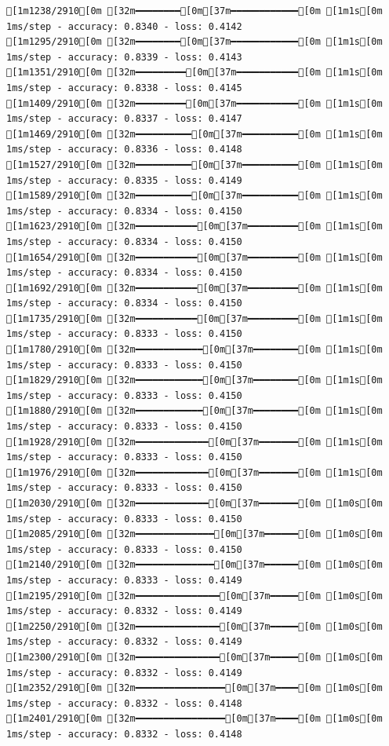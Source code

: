 \documentclass[
  letterpaper,
  DIV=11,
  numbers=noendperiod]{scrartcl}
\begin{document}
\begin{verbatim}
[1m1238/2910[0m [32m━━━━━━━━[0m[37m━━━━━━━━━━━━[0m [1m1s[0m 1ms/step - accuracy: 0.8340 - loss: 0.4142
[1m1295/2910[0m [32m━━━━━━━━[0m[37m━━━━━━━━━━━━[0m [1m1s[0m 1ms/step - accuracy: 0.8339 - loss: 0.4143
[1m1351/2910[0m [32m━━━━━━━━━[0m[37m━━━━━━━━━━━[0m [1m1s[0m 1ms/step - accuracy: 0.8338 - loss: 0.4145
[1m1409/2910[0m [32m━━━━━━━━━[0m[37m━━━━━━━━━━━[0m [1m1s[0m 1ms/step - accuracy: 0.8337 - loss: 0.4147
[1m1469/2910[0m [32m━━━━━━━━━━[0m[37m━━━━━━━━━━[0m [1m1s[0m 1ms/step - accuracy: 0.8336 - loss: 0.4148
[1m1527/2910[0m [32m━━━━━━━━━━[0m[37m━━━━━━━━━━[0m [1m1s[0m 1ms/step - accuracy: 0.8335 - loss: 0.4149
[1m1589/2910[0m [32m━━━━━━━━━━[0m[37m━━━━━━━━━━[0m [1m1s[0m 1ms/step - accuracy: 0.8334 - loss: 0.4150
[1m1623/2910[0m [32m━━━━━━━━━━━[0m[37m━━━━━━━━━[0m [1m1s[0m 1ms/step - accuracy: 0.8334 - loss: 0.4150
[1m1654/2910[0m [32m━━━━━━━━━━━[0m[37m━━━━━━━━━[0m [1m1s[0m 1ms/step - accuracy: 0.8334 - loss: 0.4150
[1m1692/2910[0m [32m━━━━━━━━━━━[0m[37m━━━━━━━━━[0m [1m1s[0m 1ms/step - accuracy: 0.8334 - loss: 0.4150
[1m1735/2910[0m [32m━━━━━━━━━━━[0m[37m━━━━━━━━━[0m [1m1s[0m 1ms/step - accuracy: 0.8333 - loss: 0.4150
[1m1780/2910[0m [32m━━━━━━━━━━━━[0m[37m━━━━━━━━[0m [1m1s[0m 1ms/step - accuracy: 0.8333 - loss: 0.4150
[1m1829/2910[0m [32m━━━━━━━━━━━━[0m[37m━━━━━━━━[0m [1m1s[0m 1ms/step - accuracy: 0.8333 - loss: 0.4150
[1m1880/2910[0m [32m━━━━━━━━━━━━[0m[37m━━━━━━━━[0m [1m1s[0m 1ms/step - accuracy: 0.8333 - loss: 0.4150
[1m1928/2910[0m [32m━━━━━━━━━━━━━[0m[37m━━━━━━━[0m [1m1s[0m 1ms/step - accuracy: 0.8333 - loss: 0.4150
[1m1976/2910[0m [32m━━━━━━━━━━━━━[0m[37m━━━━━━━[0m [1m1s[0m 1ms/step - accuracy: 0.8333 - loss: 0.4150
[1m2030/2910[0m [32m━━━━━━━━━━━━━[0m[37m━━━━━━━[0m [1m0s[0m 1ms/step - accuracy: 0.8333 - loss: 0.4150
[1m2085/2910[0m [32m━━━━━━━━━━━━━━[0m[37m━━━━━━[0m [1m0s[0m 1ms/step - accuracy: 0.8333 - loss: 0.4150
[1m2140/2910[0m [32m━━━━━━━━━━━━━━[0m[37m━━━━━━[0m [1m0s[0m 1ms/step - accuracy: 0.8333 - loss: 0.4149
[1m2195/2910[0m [32m━━━━━━━━━━━━━━━[0m[37m━━━━━[0m [1m0s[0m 1ms/step - accuracy: 0.8332 - loss: 0.4149
[1m2250/2910[0m [32m━━━━━━━━━━━━━━━[0m[37m━━━━━[0m [1m0s[0m 1ms/step - accuracy: 0.8332 - loss: 0.4149
[1m2300/2910[0m [32m━━━━━━━━━━━━━━━[0m[37m━━━━━[0m [1m0s[0m 1ms/step - accuracy: 0.8332 - loss: 0.4149
[1m2352/2910[0m [32m━━━━━━━━━━━━━━━━[0m[37m━━━━[0m [1m0s[0m 1ms/step - accuracy: 0.8332 - loss: 0.4148
[1m2401/2910[0m [32m━━━━━━━━━━━━━━━━[0m[37m━━━━[0m [1m0s[0m 1ms/step - accuracy: 0.8332 - loss: 0.4148

\end{verbatim}
\end{document}
